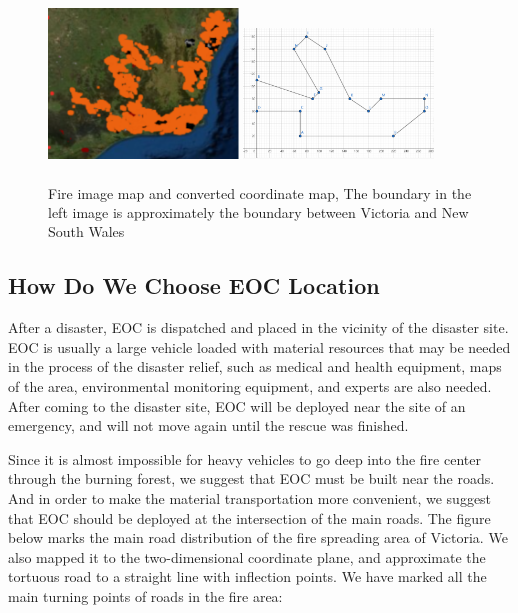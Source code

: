 \documentclass{mcmthesis}
\newcommand{\upcite}[1]{\textsuperscript{\textsuperscript{\cite{#1}}}}
\begin{document}
        \begin{figure}[H]
            \centering
            {
            \includegraphics[width=0.45\textwidth]{image/firemap.png} 
            }
            {
            \includegraphics[width=0.45\textwidth]{image/1.png}
            }
            \caption{Fire image map and converted coordinate map\upcite{fire_website},
            The boundary in the left image is approximately the boundary between Victoria and New South Wales}
            \label{png1}
        \end{figure}

\subsection{How Do We Choose EOC Location}
After a disaster, EOC is dispatched and placed in the vicinity of the disaster site. EOC is usually a large vehicle loaded with material resources that may be needed in the process of the disaster relief, such as medical and health equipment, maps of the area, environmental monitoring equipment, and experts are also needed. After coming to the disaster site, EOC will be deployed near the site of an emergency, and will not move again until the rescue was finished. 

Since it is almost impossible for heavy vehicles to go deep into the fire center through the burning forest, we suggest that EOC must be built near the roads. And in order to make the material transportation more convenient, we suggest that EOC should be deployed at the intersection of the main roads. The figure below marks the main road distribution of the fire spreading area of Victoria. We also mapped it to the two-dimensional coordinate plane, and approximate the tortuous road to a straight line with inflection points. We have marked all the main turning points of roads in the fire area:
\end{document}
